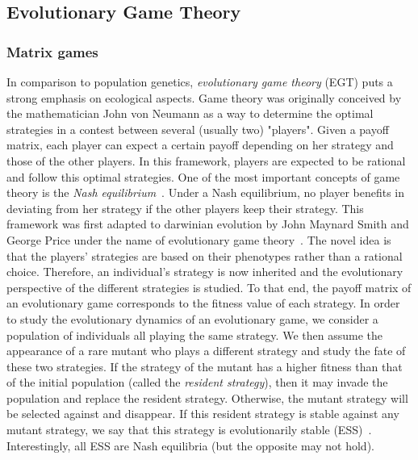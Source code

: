 

    \subsection{Evolutionary Game Theory}

        \subsubsection{Matrix games}

            In comparison to population genetics, \emph{evolutionary game theory} (EGT) puts a strong emphasis on ecological aspects. Game theory was originally conceived by the mathematician John von Neumann as a way to determine the optimal strategies in a contest between several (usually two) "players". Given a payoff matrix, each player can expect a certain payoff depending on her strategy and those of the other players. In this framework, players are expected to be rational and follow this optimal strategies. One of the most important concepts of game theory is the \emph{Nash equilibrium}~\parencite{Nash1950}. Under a Nash equilibrium, no player benefits in deviating from her strategy if the other players keep their strategy. This framework was first adapted to darwinian evolution by John Maynard Smith and George Price under the name of evolutionary game theory~\parencite{MaynardSmith1973}. The novel idea is that the players' strategies are based on their phenotypes rather than a rational choice. Therefore, an individual's strategy is now inherited and the evolutionary perspective of the different strategies is studied. To that end, the payoff matrix of an evolutionary game corresponds to the fitness value of each strategy. In order to study the evolutionary dynamics of an evolutionary game, we consider a population of individuals all playing the same strategy. We then assume the appearance of a rare mutant who plays a different strategy and study the fate of these two strategies. If the strategy of the mutant has a higher fitness than that of the initial population (called the \emph{resident strategy}), then it may invade the population and replace the resident strategy. Otherwise, the mutant strategy will be selected against and disappear. If this resident strategy is stable against any mutant strategy, we say that this strategy is evolutionarily stable (ESS)~\parencite{MaynardSmith1973}. Interestingly, all ESS are Nash equilibria (but the opposite may not hold).

